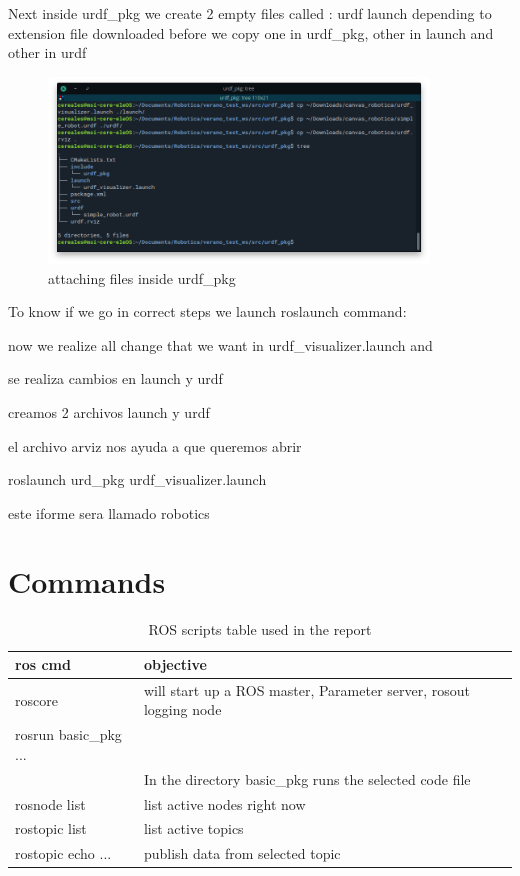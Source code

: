 \documentclass{article}
\begin{document}
Next inside urdf\_pkg we create 2 empty files called : urdf launch
depending to extension file downloaded before we copy one in urdf\_pkg, other in launch and other in urdf

\begin{figure}[H]
    \centering
    \includegraphics[width=0.9\textwidth]{images/urdf_rviz.png}
    \caption{attaching files inside urdf_pkg}
    \label{fig:urdf_rviz}
\end{figure}

To know if we go in correct steps we launch roslaunch command:




now we realize all change that we want in urdf\_visualizer.launch and 


se realiza cambios en launch y urdf 


creamos 2 archivos launch y urdf

el archivo arviz nos ayuda  a que queremos abrir

roslaunch urd\_pkg urdf\_visualizer.launch

este iforme sera llamado robotics

\section{Commands}

\begin{table}[H]
\begin{tabular}{ll}
\hline
\multicolumn{1}{|l|}{ros cmd} & \multicolumn{1}{l|}{objective}                                    \\ \hline
roscore                           & will start up a ROS master, Parameter server, rosout logging node \\
rosrun basic\_pkg ...     \\         & In the directory basic\_pkg runs the selected code file        \\
rosnode list                      & list active nodes right now                                       \\
rostopic list                     & list active topics                                                \\
rostopic echo ...                 & publish data from selected topic                                  
\end{tabular}
\caption{ROS scripts table used in the report}
\end{table}
\end{document}
